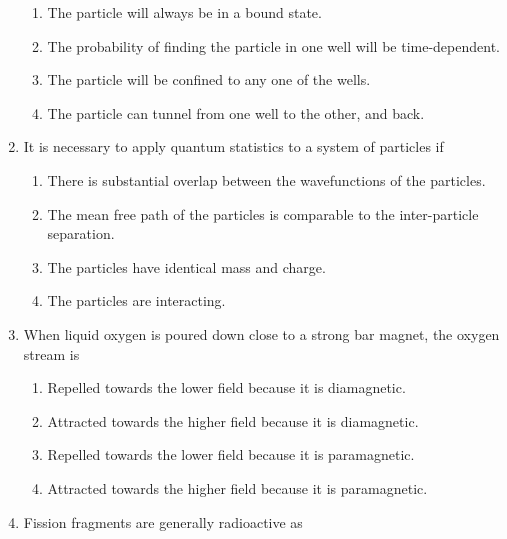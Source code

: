 \documentclass[journal,12pt,onecolumn]{IEEEtran}
\begin{document}
\begin{enumerate}[itemsep = 1em]
\hfill{}

\begin{enumerate}
    \item The particle will always be in a bound state.
    \item The probability of finding the particle in one well will be time-dependent.
    \item The particle will be confined to any one of the wells.
    \item The particle can tunnel from one well to the other, and back.
\end{enumerate}



\item It is necessary to apply quantum statistics to a system of particles if

\hfill{}

\begin{enumerate}
    \item There is substantial overlap between the wavefunctions of the particles.
    \item The mean free path of the particles is comparable to the inter-particle separation.
    \item The particles have identical mass and charge.
    \item The particles are interacting.
\end{enumerate}


\item When liquid oxygen is poured down close to a strong bar magnet, the oxygen stream is

\hfill{}

\begin{enumerate}
    \item Repelled towards the lower field because it is diamagnetic.
    \item Attracted towards the higher field because it is diamagnetic.
    \item Repelled towards the lower field because it is paramagnetic.
    \item Attracted towards the higher field because it is paramagnetic.
\end{enumerate}


\item Fission fragments are generally radioactive as

\hfill{}


\end{enumerate}
\end{document}
